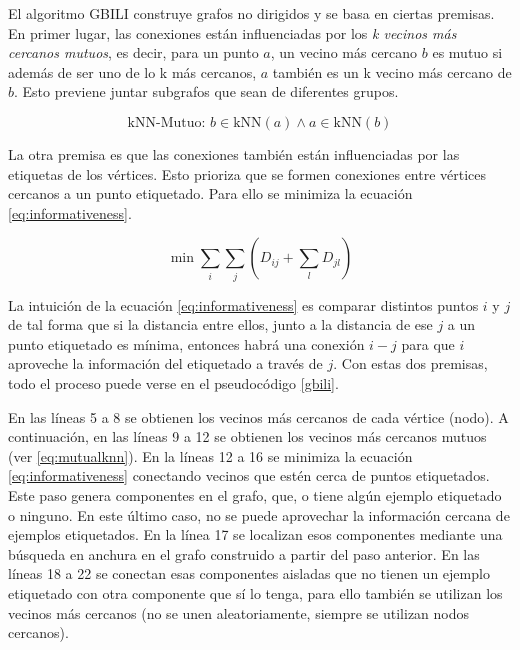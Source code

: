 El algoritmo GBILI construye grafos no dirigidos y se basa en ciertas premisas. En primer lugar, las conexiones están influenciadas por los \textit{k vecinos más cercanos mutuos}, es decir, para un punto $a$, un vecino más cercano $b$ es mutuo si además de ser uno de lo k más cercanos, $a$ también es un k vecino más cercano de $b$. Esto previene juntar subgrafos que sean de diferentes grupos.

\begin{equation}
\text{kNN-Mutuo: } b \in \text{kNN}(a) \land a \in \text{kNN}(b)
\label{eq:mutualknn}
\end{equation}

La otra premisa es que las conexiones también están influenciadas por las etiquetas de los vértices. Esto prioriza que se formen conexiones entre vértices cercanos a un punto etiquetado. Para ello se minimiza la ecuación \ref{eq:informativeness}. 

\begin{equation}
\min \sum_{i} \sum_{j} \left( D_{ij} + \sum_{l} D_{jl} \right)
\label{eq:informativeness}
\end{equation}

La intuición de la ecuación \ref{eq:informativeness} es comparar distintos puntos $i$ y $j$ de tal forma que si la distancia entre ellos, junto a la distancia de ese $j$ a un punto etiquetado es mínima, entonces habrá una conexión $i-j$ para que $i$ aproveche la información del etiquetado a través de $j$. Con estas dos premisas, todo el proceso puede verse en el pseudocódigo \ref{gbili}.



En las líneas 5 a 8 se obtienen los vecinos más cercanos de cada vértice (nodo). A continuación, en las líneas 9 a 12 se obtienen los vecinos más cercanos mutuos (ver \ref{eq:mutualknn}). 
En la líneas 12 a 16 se minimiza la ecuación \ref{eq:informativeness} conectando vecinos que estén cerca de puntos etiquetados. Este paso genera componentes en el grafo, que, o tiene algún ejemplo etiquetado o ninguno. En este último caso, no se puede aprovechar la información cercana de ejemplos etiquetados.
En la línea 17 se localizan esos componentes mediante una búsqueda en anchura en el grafo construido a partir del paso anterior. En las líneas 18 a 22 se conectan esas componentes aisladas que no tienen un ejemplo etiquetado con otra componente que sí lo tenga, para ello también se utilizan los vecinos más cercanos (no se unen aleatoriamente, siempre se utilizan nodos cercanos).

